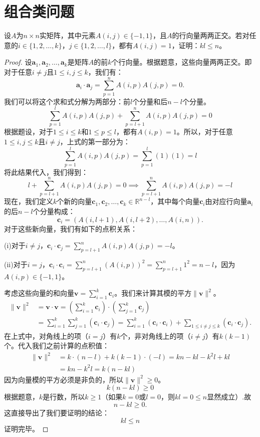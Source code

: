 \documentclass[../../main.tex]{subfiles}
\begin{document}
\section{组合类问题}

\begin{example}
设$A$为$n \times n$实矩阵，其中元素$A(i,j) \in \{-1,1\}$，且$A$的行向量两两正交。若对任意的$i \in \{1,2,\ldots,k\}$，$j \in \{1,2,\ldots,l\}$，都有$A(i,j) = 1$，证明：$kl \leqslant n$。
\end{example}
\begin{proof}
设$\mathbf{a}_1, \mathbf{a}_2, \ldots, \mathbf{a}_k$是矩阵$A$的前$k$个行向量。根据题意，这些向量两两正交。即对于任意$i \neq j$且$1 \leq i, j \leq k$，我们有：
\[
\mathbf{a}_i \cdot \mathbf{a}_j = \sum_{p=1}^n A(i, p)A(j, p) = 0.
\]
我们可以将这个求和式分解为两部分：前$l$个分量和后$n - l$个分量。
\[
\sum_{p=1}^l A(i, p)A(j, p) + \sum_{p=l+1}^n A(i, p)A(j, p) = 0 
\]
根据题设，对于$1 \leq i \leq k$和$1 \leq p \leq l$，都有$A(i, p) = 1$。所以，对于任意$1 \leq i, j \leq k$且$i \neq j$，上式的第一部分为：
\[
\sum_{p=1}^l A(i, p)A(j, p) = \sum_{p=1}^l (1)(1) = l 
\]
将此结果代入，我们得到：
\[
l + \sum_{p=l+1}^n A(i, p)A(j, p) = 0 \implies \sum_{p=l+1}^n A(i, p)A(j, p) = -l 
\]
现在，我们定义$k$个新的向量$\mathbf{c}_1, \mathbf{c}_2, \ldots, \mathbf{c}_k \in \mathbb{R}^{n - l}$，其中每个向量$\mathbf{c}_i$由对应行向量$\mathbf{a}_i$的后$n - l$个分量构成：
\[
\mathbf{c}_i = (A(i, l + 1), A(i, l + 2), \ldots, A(i, n)).
\]
对于这些新向量，我们有如下的点积关系：

(i)对于$i \neq j$，$\mathbf{c}_i \cdot \mathbf{c}_j = \sum_{p=l+1}^n A(i, p)A(j, p) = -l$。

(ii)对于$i = j$，$\mathbf{c}_i \cdot \mathbf{c}_i = \sum_{p=l+1}^n (A(i, p))^2 = \sum_{p=l+1}^n 1^2 = n - l$，因为$A(i, p) \in \{-1, 1\}$。

考虑这些向量的和向量$\mathbf{v} = \sum_{i=1}^k \mathbf{c}_i$。我们来计算其模的平方$\|\mathbf{v}\|^2$。
\begin{align*}
\|\mathbf{v}\|^2 &= \mathbf{v} \cdot \mathbf{v} = \left( \sum_{i=1}^k \mathbf{c}_i \right) \cdot \left( \sum_{j=1}^k \mathbf{c}_j \right) \\
&= \sum_{i=1}^k \sum_{j=1}^k (\mathbf{c}_i \cdot \mathbf{c}_j)= \sum_{i=1}^k (\mathbf{c}_i \cdot \mathbf{c}_i) + \sum_{1 \leq i \neq j \leq k} (\mathbf{c}_i \cdot \mathbf{c}_j).
\end{align*}
在上式中，对角线上的项（$i = j$）有$k$个，非对角线上的项（$i \neq j$）有$k(k - 1)$个。代入我们之前计算的点积值：
\begin{align*}
\|\mathbf{v}\|^2 &= k \cdot (n - l) + k(k - 1) \cdot (-l) = kn - kl - k^2 l + kl \\
&= kn - k^2 l = k(n - kl)
\end{align*}
因为向量模的平方必须是非负的，所以$\|\mathbf{v}\|^2 \geq 0$。
\[
k(n - kl) \geqslant 0
\]
根据题意，$k$是行数，所以$k \geq 1$（如果$k = 0$或$l = 0$，则$kl = 0 \leq n$显然成立）.故
\[
n - kl \geqslant 0.
\]
这直接导出了我们要证明的结论：
\[
kl \leq n \label{eq:12}
\]
证明完毕。

\end{proof}
\end{document}
